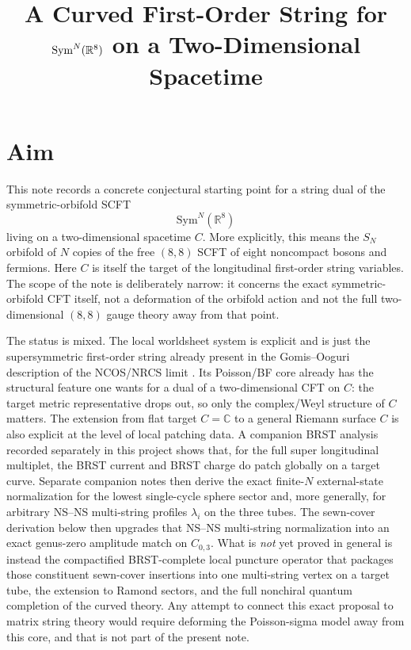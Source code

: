 \documentclass[11pt]{article}
\title{A Curved First-Order String for \texorpdfstring{$\Sym^N(\bR^8)$}{SymN(R8)} on a Two-Dimensional Spacetime}
\author{}
\date{}
\newcommand{\Sym}{\mathrm{Sym}}
\newcommand{\bC}{\mathbb{C}}
\newcommand{\bR}{\mathbb{R}}
\begin{document}
\maketitle

\section{Aim}
This note records a concrete conjectural starting point for a string dual of the symmetric-orbifold SCFT
\begin{equation}\label{eq:proposed-dual-cft}
\Sym^N(\bR^8)
\end{equation}
living on a two-dimensional spacetime $C$. More explicitly, this means the $S_N$ orbifold of $N$ copies of the free $(8,8)$ SCFT of eight noncompact bosons and fermions. Here $C$ is itself the target of the longitudinal first-order string variables. The scope of the note is deliberately narrow: it concerns the exact symmetric-orbifold CFT itself, not a deformation of the orbifold action and not the full two-dimensional $(8,8)$ gauge theory away from that point.

The status is mixed. The local worldsheet system is explicit and is just the supersymmetric first-order string already present in the Gomis--Ooguri description of the NCOS/NRCS limit \cite{gomis2000nonrelativisticclosedstringtheory}. Its Poisson/BF core already has the structural feature one wants for a dual of a two-dimensional CFT on $C$: the target metric representative drops out, so only the complex/Weyl structure of $C$ matters. The extension from flat target $C=\bC$ to a general Riemann surface $C$ is also explicit at the level of local patching data. A companion BRST analysis recorded separately in this project shows that, for the full super longitudinal multiplet, the BRST current and BRST charge do patch globally on a target curve. Separate companion notes then derive the exact finite-$N$ external-state normalization for the lowest single-cycle sphere sector and, more generally, for arbitrary NS--NS multi-string profiles $\lambda_i$ on the three tubes. The sewn-cover derivation below then upgrades that NS--NS multi-string normalization into an exact genus-zero amplitude match on $C_{0,3}$. What is \emph{not} yet proved in general is instead the compactified BRST-complete local puncture operator that packages those constituent sewn-cover insertions into one multi-string vertex on a target tube, the extension to Ramond sectors, and the full nonchiral quantum completion of the curved theory. Any attempt to connect this exact proposal to matrix string theory would require deforming the Poisson-sigma model away from this core, and that is not part of the present note.
\end{document}
